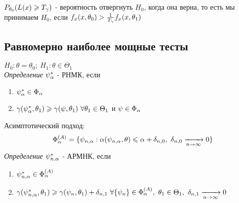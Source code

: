 $P_{\theta_0}(L(x) \geqslant T_{\gamma})$ - вероятность отвергнуть $H_0$, когда она верна, то есть мы принимаем $H_0$, если $f_x(x, \theta_0) > \frac{1}{T_{\gamma}}f_x(x, \theta_1)$

\subsection{Равномерно наиболее мощные тесты}

$H_0 : \theta = \theta_0;~H_1 : \theta \in \Theta_1$ \\
\textit{Определение} $\psi_{\alpha}^{*}$ - РНМК, если
\begin{enumerate}
  \item $\psi_{\alpha}^{*} \in \Phi_{\alpha}$
  \item $\gamma(\psi_{\alpha}^{*}, \theta_1) \geqslant \gamma(\psi, \theta_1)~\forall \theta_1 \in \Theta_1$ и $\psi \in \Phi_{\alpha}$
\end{enumerate}

Асимптотический подход: \\
\[
  \Phi_{\alpha}^{(A)} = \{ \psi_{n, \alpha} : \alpha(\psi_{n, \alpha}, \theta) \leqslant \alpha + \delta_{n, 0},~\delta_{n, 0} \xrightarrow[n \to \infty]{} 0 \}
\]
\textit{Определение} $\psi_{n, \alpha}^{*}$ - АРМНК, если
\begin{enumerate}
  \item $\psi_{n, \alpha}^{*} \in \Phi_{\alpha}^{(A)}$
  \item $\gamma(\psi_{n, \alpha}^{*}, \theta_1) \geqslant \gamma(\psi_n, \theta_1) + \delta_{n, 1}~\forall\{\psi_n\} \in \Phi_{\alpha}^{(A)},~\theta_1 \in \Theta_1,~
 \delta_{n, 1} \xrightarrow[n \to \infty]{} 0$
\end{enumerate}
